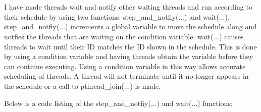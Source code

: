 \documentclass[a4paper,11pt]{article}
\begin{document}
\\
\\
I have made threads wait and notify other waiting threads and run according to their schedule by using two functions: step\_and\_notfiy(...) and wait(...). step\_and\_notfiy(...) increments a global variable to move the schedule along and notfies the threads that are waiting on the condition variable. wait(...) causes threads to wait until their ID matches the ID shown in the schedule. This is done by using a condition variable and having threads obtain the variable before they can continue executing. Using a condition variable in this way allows accurate scheduling of threads. A thread will not terminate until it no longer appears in the schedule or a call to pthread\_join(...) is made. 

\clearpage
\noindent
Below is a code listing of the step\_and\_notfiy(...) and wait(...) functions:

\clearpage
\end{document}
